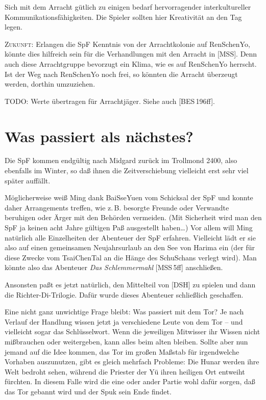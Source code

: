 \documentclass[
a4paper,
twoside,
DIV=calc,
BCOR=4mm,
fontsize=9pt,
twocolumn=on,
titlepage=on,
parskip=half
]{scrartcl}
\begin{document}
Sich mit dem Arracht gütlich zu einigen bedarf hervorragender
interkultureller Kommunikationsfähigkeiten. Die Spieler sollten hier
Kreativität an den Tag legen.

\textsc{Zukunft:} Erlangen die SpF Kenntnis von der Arrachtkolonie auf
RenSchenYo, könnte dies hilfreich sein für die Verhandlungen mit den
Arracht in [MSS]. Denn auch diese Arrachtgruppe bevorzugt ein Klima,
wie es auf RenSchenYo herrscht. Ist der Weg nach RenSchenYo noch frei,
so könnten die Arracht überzeugt werden, dorthin umzuziehen.

TODO: Werte übertragen für Arrachtjäger. Siehe auch [BES\,196ff].

\appendix

\section{Was passiert als nächstes?}

Die SpF kommen endgültig nach Midgard zurück im Trollmond 2400, also
ebenfalls im Winter, so daß ihnen die Zeitverschiebung vielleicht erst
sehr viel später auffällt.

Möglicherweise weiß Ming dank BaiSseYuen vom Schicksal der SpF und
konnte daher Arrangements treffen, wie z.\,B. besorgte Freunde oder
Verwandte beruhigen oder Ärger mit den Behörden vermeiden. (Mit
Sicherheit wird man den SpF ja keinen acht Jahre gültigen Paß
ausgestellt haben\dots) Vor allem will Ming natürlich alle
Einzelheiten der Abenteuer der SpF erfahren. Vielleicht lädt er sie
also auf einen gemeinsamen Neujahrsurlaub an den See von Harima ein
(der für diese Zwecke vom TsaiChenTal an die Hänge des SchuSchans
verlegt wird). Man könnte also das Abenteuer \emph{Das Schlemmermahl}
[MSS\,5ff] anschließen.

Ansonsten paßt es jetzt natürlich, den Mittelteil von [DSH] zu spielen
und dann die Richter-Di-Trilogie. Dafür wurde dieses Abenteuer
schließlich geschaffen.

Eine nicht ganz unwichtige Frage bleibt: Was passiert mit dem Tor? Je
nach Verlauf der Handlung wissen jetzt ja verschiedene Leute von dem
Tor -- und vielleicht sogar das Schlüsselwort. Wenn die jeweiligen
Mitwisser ihr Wissen nicht mißbrauchen oder weitergeben, kann alles
beim alten bleiben. Sollte aber nun jemand auf die Idee kommen, das
Tor im großen Maßstab für irgendwelche Vorhaben auszunutzen, gibt es
gleich mehrfach Probleme: Die Hunar werden ihre Welt bedroht sehen,
während die Priester der Yü ihren heiligen Ort entweiht fürchten. In
diesem Falle wird die eine oder ander Partie wohl dafür sorgen, daß
das Tor gebannt wird und der Spuk sein Ende findet.
\end{document}
